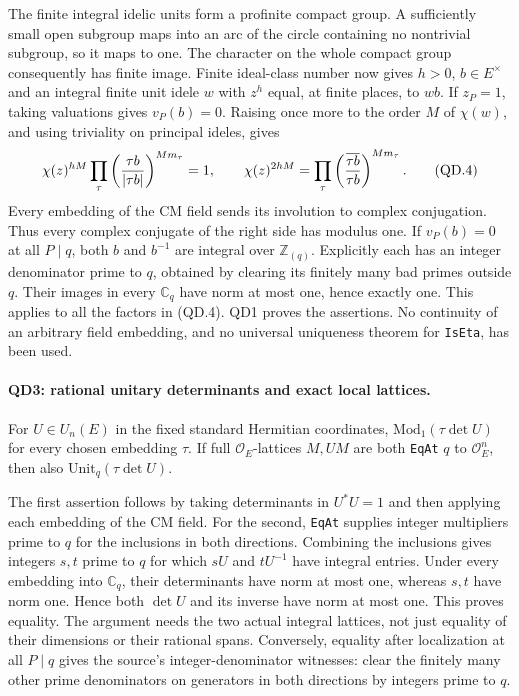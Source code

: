 The finite integral idelic units form a profinite compact group.
A sufficiently small open subgroup maps into an arc of the
circle containing no nontrivial subgroup, so it maps to one.
The character on the whole compact group consequently has finite
image.  Finite ideal-class number now gives $h>0$, $b\in E^\times$
and an integral finite unit idele $w$ with $z^h$ equal, at finite
places, to $w b$.  If $z_P=1$, taking valuations gives $v_P(b)=0$.
Raising once more to the order $M$ of $\chi(w)$, and using
triviality on principal ideles, gives
\[
 \chi(z)^{hM}\prod_\tau
       \left({\tau b\over|\tau b|}\right)^{M m_\tau}=1,
 \qquad
 \chi(z)^{2hM}=
       \prod_\tau\left({\overline{\tau b}\over\tau b}
                  \right)^{M m_\tau}.                    \tag{QD.4}
\]
Every embedding of the CM field sends its involution to complex
conjugation.  Thus every complex conjugate of the right side has
modulus one.  If $v_P(b)=0$ at all $P\mid q$, both $b$ and $b^{-1}$
are integral over $\mathbb Z_{(q)}$.  Explicitly each has an integer
denominator prime to $q$, obtained by clearing its finitely many
bad primes outside $q$.  Their images in every $\mathbb C_q$ have
norm at most one, hence exactly one.  This applies to all the
factors in (QD.4).  QD1 proves the assertions.  No continuity of
an arbitrary field embedding, and no universal uniqueness theorem
for \texttt{IsEta}, has been used.

\paragraph{QD3: rational unitary determinants and exact local lattices.}
For $U\in U_n(E)$ in the fixed standard Hermitian coordinates,
$\mathrm{Mod}_1(\tau\det U)$ for every chosen embedding $\tau$.
If full $\mathcal O_E$-lattices $M,UM$ are both
\texttt{EqAt} $q$ to $\mathcal O_E^n$, then also
$\mathrm{Unit}_q(\tau\det U)$.

The first assertion follows by taking determinants in $U^*U=1$
and then applying each embedding of the CM field.  For the
second, \texttt{EqAt} supplies integer multipliers prime to $q$
for the inclusions in both directions.  Combining the inclusions
gives integers $s,t$ prime to $q$ for which $sU$ and $tU^{-1}$
have integral entries.  Under every embedding into $\mathbb C_q$,
their determinants have norm at most one, whereas $s,t$ have
norm one.  Hence both $\det U$ and its inverse have norm at most
one.  This proves equality.  The argument needs the two actual
integral lattices, not just equality of their dimensions or their
rational spans.  Conversely, equality after localization at all
$P\mid q$ gives the source's integer-denominator witnesses:
clear the finitely many other prime denominators on generators
in both directions by integers prime to $q$.

